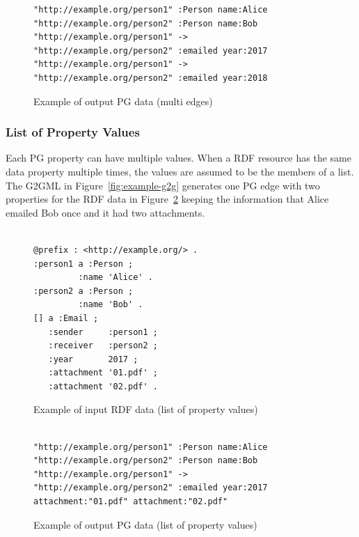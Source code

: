 \documentclass[runningheads]{llncs}
\begin{document}
\begin{figure}[!t]
\begin{scriptsize}
\begin{verbatim}
"http://example.org/person1" :Person name:Alice
"http://example.org/person2" :Person name:Bob
"http://example.org/person1" -> "http://example.org/person2" :emailed year:2017
"http://example.org/person1" -> "http://example.org/person2" :emailed year:2018
\end{verbatim}
\end{scriptsize}
\caption{Example of output PG data (multi edges)}
\label{fig:example-pg2}
\end{figure}

\subsubsection{List of Property Values}
Each PG property can have multiple values. When a RDF resource has the same data property multiple times, the values are assumed to be the members of a list. The G2GML in Figure~\ref{fig:example-g2g} generates one PG edge with two properties for the RDF data in Figure~\ref{fig:example-rdf3} keeping the information that Alice emailed Bob once and it had two attachments.


\begin{figure}[!t]
\begin{scriptsize}
\begin{verbatim}

@prefix : <http://example.org/> .
:person1 a :Person ;
         :name 'Alice' .
:person2 a :Person ;
         :name 'Bob' .
[] a :Email ;
   :sender     :person1 ;
   :receiver   :person2 ;
   :year       2017 ;
   :attachment '01.pdf' ;
   :attachment '02.pdf' .

\end{verbatim}
\end{scriptsize}
\caption{Example of input RDF data (list of property values)}
\label{fig:example-rdf3}
\end{figure}


\begin{figure}[!t]
\begin{scriptsize}
\begin{verbatim}

"http://example.org/person1" :Person name:Alice
"http://example.org/person2" :Person name:Bob
"http://example.org/person1" -> "http://example.org/person2" :emailed year:2017 attachment:"01.pdf" attachment:"02.pdf"

\end{verbatim}
\end{scriptsize}
\caption{Example of output PG data (list of property values)}
\label{fig:example-pg3}
\end{figure}
\end{document}
